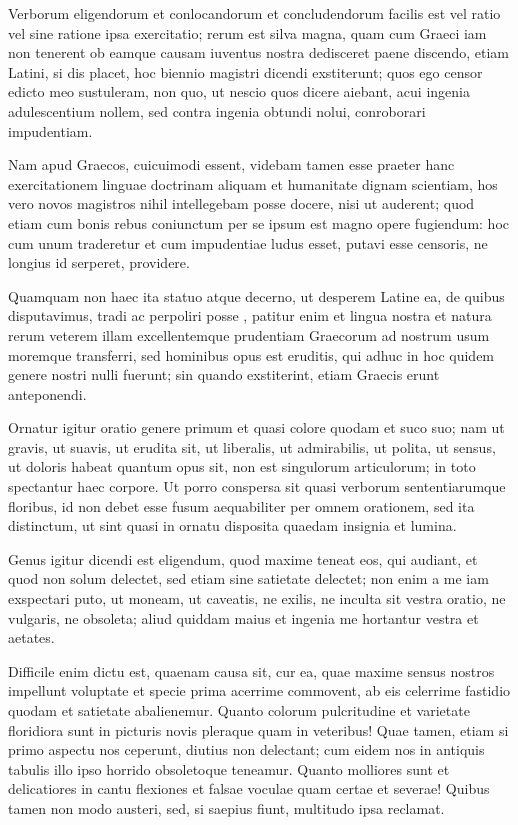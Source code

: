  Verborum eligendorum et conlocandorum et concludendorum facilis est vel ratio vel sine ratione ipsa exercitatio; rerum est silva magna, quam cum Graeci iam non tenerent ob eamque causam iuventus nostra dedisceret paene discendo, etiam Latini, si dis placet, hoc biennio magistri dicendi exstiterunt; quos ego censor edicto meo sustuleram, non quo, ut nescio quos dicere aiebant, acui ingenia adulescentium nollem, sed contra ingenia obtundi nolui, conroborari impudentiam.

 Nam apud Graecos, cuicuimodi essent, videbam tamen esse praeter hanc exercitationem linguae doctrinam aliquam et humanitate dignam scientiam, hos vero novos magistros nihil intellegebam posse docere, nisi ut auderent; quod etiam cum bonis rebus coniunctum per se ipsum est magno opere fugiendum: hoc cum unum traderetur et cum impudentiae ludus esset, putavi esse censoris, ne longius id serperet, providere.

 Quamquam non haec ita statuo atque decerno, ut desperem Latine ea, de quibus disputavimus, tradi ac perpoliri posse , patitur enim et lingua nostra et natura rerum veterem illam excellentemque prudentiam Graecorum ad nostrum usum moremque transferri, sed hominibus opus est eruditis, qui adhuc in hoc quidem genere nostri nulli fuerunt; sin quando exstiterint, etiam Graecis erunt anteponendi.

 Ornatur igitur oratio genere primum et quasi colore quodam et suco suo; nam ut gravis, ut suavis, ut erudita sit, ut liberalis, ut admirabilis, ut polita, ut sensus, ut doloris habeat quantum opus sit, non est singulorum articulorum; in toto spectantur haec corpore. Ut porro conspersa sit quasi verborum sententiarumque floribus, id non debet esse fusum aequabiliter per omnem orationem, sed ita distinctum, ut sint quasi in ornatu disposita quaedam insignia et lumina.

 Genus igitur dicendi est eligendum, quod maxime teneat eos, qui audiant, et quod non solum delectet, sed etiam sine satietate delectet; non enim a me iam exspectari puto, ut moneam, ut caveatis, ne exilis, ne inculta sit vestra oratio, ne vulgaris, ne obsoleta; aliud quiddam maius et ingenia me hortantur vestra et aetates.

 Difficile enim dictu est, quaenam causa sit, cur ea, quae maxime sensus nostros impellunt voluptate et specie prima acerrime commovent, ab eis celerrime fastidio quodam et satietate abalienemur. Quanto colorum pulcritudine et varietate floridiora sunt in picturis novis pleraque quam in veteribus! Quae tamen, etiam si primo aspectu nos ceperunt, diutius non delectant; cum eidem nos in antiquis tabulis illo ipso horrido obsoletoque teneamur. Quanto molliores sunt et delicatiores in cantu flexiones et falsae voculae quam certae et severae! Quibus tamen non modo austeri, sed, si saepius fiunt, multitudo ipsa reclamat.

